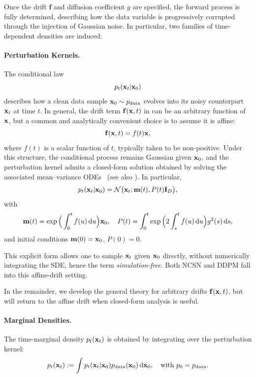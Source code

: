 Once the drift $\mathbf{f}$ and diffusion coefficient $g$ are specified, the forward process is fully determined, describing how the data variable is progressively corrupted through the injection of Gaussian noise. In particular, two families of time-dependent densities are induced:
\paragraph{Perturbation Kernels.} 
The conditional law
\[
p_t({\mathbf{x}}_t |{\mathbf{x}}_0)
\]
describes how a clean data sample $ {\mathbf{x}}_0 \sim p_{\mathrm{data}} $ evolves into its noisy counterpart ${\mathbf{x}}_t$ at time $t$. In general, the drift term ${\mathbf{f}}({\mathbf{x}},t)$ in  can be an arbitrary function of ${\mathbf{x}}$, but a common and analytically convenient choice is to assume it is affine:
\begin{equation}\label{eq:affine-drift}
    {\mathbf{f}}({\mathbf{x}},t) = f(t) {\mathbf{x}}, 
\end{equation}
where $f(t)$ is a scalar function of $t$, typically taken to be non-positive. 
Under this structure, the conditional process remains Gaussian given
${\mathbf{x}}_0$, and the perturbation kernel admits a closed-form solution obtained
by solving the associated mean--variance ODEs~\citep{sarkka2019applied}
(see also ). {In particular,
\[
p_t({\mathbf{x}}_t |{\mathbf{x}}_0) = \mathcal{N} \big({\mathbf{x}}_t; {\mathbf{m}}(t), P(t)\mathbf I_D\big),
\]
with
\[
{\mathbf{m}}(t) = \exp \Big(\int_0^t f(u) \mathop{}\!\mathrm{d} u\Big) {\mathbf{x}}_0,
\quad
P(t) = \int_0^t \exp \Big(2 \int_s^t f(u) \mathop{}\!\mathrm{d} u\Big) g^2(s) \mathop{}\!\mathrm{d} s,
\]
and initial conditions ${\mathbf{m}}(0)={\mathbf{x}}_0$, $P(0)=0$.}

This explicit form allows one to sample ${\mathbf{x}}_t$ given ${\mathbf{x}}_0$ directly, without numerically integrating the SDE, hence the term \emph{simulation-free}. Both NCSN and DDPM fall into this affine-drift setting. 

In the remainder, we develop the general theory for arbitrary drifts ${\mathbf{f}}({\mathbf{x}},t)$, but will return to the affine drift when closed-form analysis is useful.



\paragraph{Marginal Densities.} 
The time-marginal density $ p_t({\mathbf{x}}_t) $ is obtained by integrating over the perturbation kernel:
\begin{equation}\label{eq:scoresde-oracle-marginal}
    p_t({\mathbf{x}}_t) := \int p_t({\mathbf{x}}_t|{\mathbf{x}}_0) p_{\mathrm{data}}({\mathbf{x}}_0) \mathop{}\!\mathrm{d} {\mathbf{x}}_0, \quad \text{with } p_0 = p_{\mathrm{data}}.
\end{equation}

